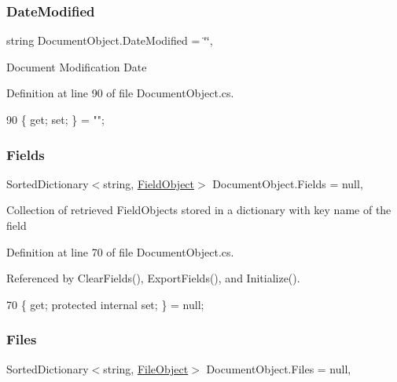 \subsubsection{\texorpdfstring{Date\+Modified}{DateModified}}
{\footnotesize\ttfamily string Document\+Object.\+Date\+Modified = \char`\"{}\char`\"{}\hspace{0.3cm}{\ttfamily [get]}, {\ttfamily [set]}}



Document Modification Date 



Definition at line 90 of file Document\+Object.\+cs.


\begin{DoxyCode}
90 \{ \textcolor{keyword}{get}; \textcolor{keyword}{set}; \} = \textcolor{stringliteral}{""};
\end{DoxyCode}
\mbox{\label{class_document_object_ae203b8a3e40b6c428145d2335b71245c}} 
\subsubsection{\texorpdfstring{Fields}{Fields}}
{\footnotesize\ttfamily Sorted\+Dictionary$<$string, \mbox{\hyperlink{class_field_object}{Field\+Object}}$>$ Document\+Object.\+Fields = null\hspace{0.3cm}{\ttfamily [get]}, {\ttfamily [set]}}



Collection of retrieved Field\+Objects stored in a dictionary with key name of the field 



Definition at line 70 of file Document\+Object.\+cs.



Referenced by Clear\+Fields(), Export\+Fields(), and Initialize().


\begin{DoxyCode}
70 \{ \textcolor{keyword}{get}; \textcolor{keyword}{protected} \textcolor{keyword}{internal} \textcolor{keyword}{set}; \} = null;
\end{DoxyCode}
\mbox{\label{class_document_object_afe6bcf5175607f91dde768491f23a0a4}} 
\subsubsection{\texorpdfstring{Files}{Files}}
{\footnotesize\ttfamily Sorted\+Dictionary$<$string, \mbox{\hyperlink{class_file_object}{File\+Object}}$>$ Document\+Object.\+Files = null\hspace{0.3cm}{\ttfamily [get]}, {\ttfamily [set]}}



